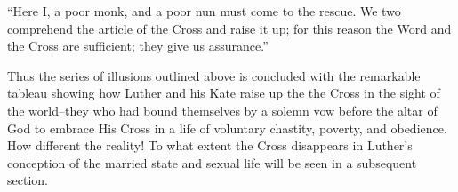 “Here I, a poor monk, and a poor nun must come to the rescue.
We two comprehend the article of the Cross and raise it up; for this
reason the Word and the Cross are sufficient; they give us assurance.”

Thus the series of illusions outlined above is concluded with the
remarkable tableau showing how Luther and his Kate raise up the
the Cross in the sight of the world--they who had bound themselves
by a solemn vow before the altar of God to embrace His Cross in a
life of voluntary chastity, poverty, and obedience. How different the
reality! To what extent the Cross disappears in Luther’s conception
of the married state and sexual life will be seen in a subsequent
section.
